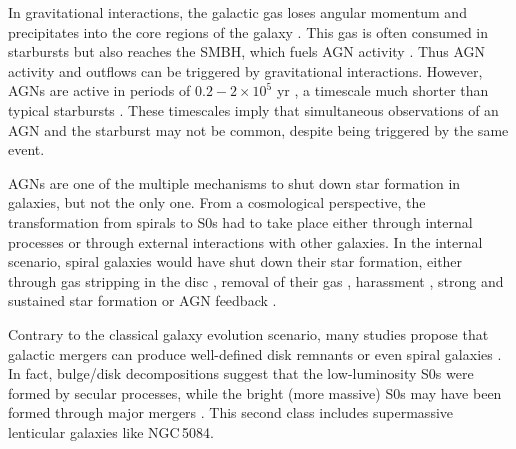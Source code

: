 \documentclass[modern]{CORE-AAS/aastex631}
\begin{document}
In gravitational interactions, the galactic gas loses angular momentum and precipitates into the core regions of the galaxy \citep{hopkins+2009apj691_1168}. This gas is often consumed in starbursts but also reaches the SMBH, which fuels AGN activity \citep{dimatteo+2005nat433_604, springel+2005mnras361_776}. Thus AGN activity and outflows can be triggered by gravitational interactions. However, AGNs are active in periods of $0.2-2\times10^{5}$ yr \citep{keel+2012mnras420_878}, a timescale much shorter than typical starbursts \citep[$\tau=10^{7}$ yr,][]{heckman+1993inproceedings_455}. These timescales imply that simultaneous observations of an AGN and the starburst may not be common, despite being triggered by the same event. 

AGNs are one of the multiple mechanisms to shut down star formation in galaxies, but not the only one. From a cosmological perspective, the transformation from spirals to S0s had to take place either through internal processes or through external interactions with other galaxies. In the internal scenario, spiral galaxies would have shut down their star formation, either through gas stripping in the disc \citep{laurikainen+2010mnras405_1089}, removal of their gas \citep[starvation or strangulation,][]{larson+1980apj237_692}, harassment \citep{moore+1996nat379_613}, strong and sustained star formation \citep{kormendy+2004araa42_603} or AGN feedback \citep{chen+2020apj897_102}. \par 

Contrary to the classical galaxy evolution scenario, many studies propose that galactic mergers can produce well-defined disk remnants \citep{hopkins+2013mnras430_1901,elichemoral+2018aap617_113} or even spiral galaxies \citep{athanassoula+2016apj821_90,peschken+2017mnras468_994}. In fact, bulge/disk decompositions suggest that the low-luminosity S0s were formed by secular processes, while the bright (more massive) S0s may have been formed through major mergers \citep{barway+2009mnras394_1991,frasermckelvie+2018mnras481_5580}. This second class includes supermassive lenticular galaxies like NGC\,5084.\par 
\end{document}
